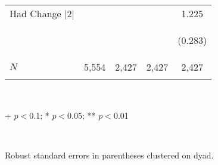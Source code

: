 \begin{center}
\begin{tabular}{lcccc}
\noalign{\smallskip}Had Change |2| &  &  &  & 1.225\\
 & \begin{footnotesize}\end{footnotesize} & \begin{footnotesize}\end{footnotesize} & \begin{footnotesize}\end{footnotesize} & \begin{footnotesize}(0.283)\end{footnotesize}\\
\noalign{\smallskip}$N$ & 5,554 & 2,427 & 2,427 & 2,427\\
\noalign{\smallskip}\hline\end{tabular}\\
\smallskip\begin{footnotesize}+ $p<0$.1; * $p<0$.05; ** $p<0$.01\end{footnotesize}\\
\begin{footnotesize}Robust standard errors in parentheses clustered on dyad.\end{footnotesize}\\
\smallskip
\end{center}
